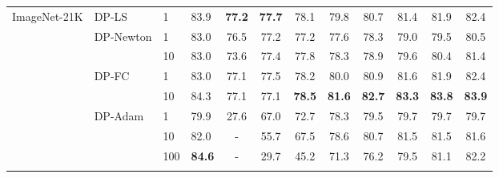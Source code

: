 \documentclass[letterpaper]{article} \usepackage{fullpage}
\begin{document}
\begin{table*}[!h]
\begin{tabular}{llll|cccccccc}
		        
		\multirow{8}{*}{ImageNet-21K} &        \multirow{ 1}{*}{DP-LS}
		                                            & 1 & 83.9 & \textbf{77.2} & \textbf{77.7} & 78.1 & 79.8 & 80.7 & 81.4 & 81.9 & 82.4 \\ \addlinespace[0.1cm]
\addlinespace[0.1cm]
		            & \multirow{ 2}{*}{DP-Newton} & 1      & 83.0        & 76.5 & 77.2 & 77.2 & 77.6 & 78.3 & 79.0 & 79.5 & 80.5                    \\
		            &                             & 10     & 83.0        & 73.6 & 77.4 & 77.8 & 78.3 & 78.9 & 79.6 & 80.4 & 81.4                    \\
		\addlinespace[0.1cm]
\addlinespace[0.1cm]
		            & \multirow{ 2}{*}{DP-FC}     & 1      & 83.0        & 77.1 & 77.5 & 78.2 & 80.0 & 80.9 & 81.6 & 81.9 & 82.4                    \\
		            &                             & 10     & 84.3        & 77.1 & 77.1 & \textbf{78.5} & \textbf{81.6} & \textbf{82.7} & \textbf{83.3} & \textbf{83.8} & \textbf{83.9}                    \\
		\addlinespace[0.1cm]
\addlinespace[0.1cm]
		            & \multirow{ 3}{*}{DP-Adam}   & 1      & 79.9        & 27.6 & 67.0 & 72.7 & 78.3 & 79.5 & 79.7 & 79.7 & 79.7                    \\
		            &                             & 10     & 82.0        & -   & 55.7 & 67.5 & 78.6 & 80.7 & 81.5 & 81.5 & 81.6                    \\
		            &                             & 100    & \textbf{84.6}        & -   & 29.7 & 45.2 & 71.3 & 76.2 & 79.5 & 81.1 & 82.2                    \\
		        
		\addlinespace[0.2cm]
		\hline
		\addlinespace[0.2cm]
		        

\end{tabular}
\end{table*}
\end{document}

